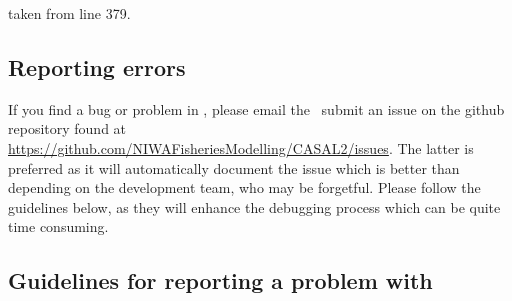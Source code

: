 
taken from line 379.


\subsection{Reporting errors\label{sec:reporting-errors}}

If you find a bug or problem in \CNAME , please email the \emaillink\  submit an issue on the github repository found at \url{https://github.com/NIWAFisheriesModelling/CASAL2/issues}. The latter is preferred as it will automatically document the issue which is better than depending on the development team, who may be forgetful. Please follow the guidelines below, as they will enhance the debugging process which can be quite time consuming.

\subsection{Guidelines for reporting a problem with \CNAME\label{sec:error-guidelines}}

